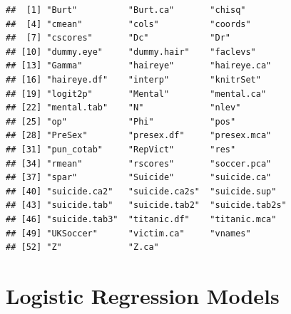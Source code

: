 \documentclass[11pt]{book}
\renewenvironment{knitrout}{\small\renewcommand{\baselinestretch}{.85}}{} %
\begin{document}
\begin{knitrout}\footnotesize
{}\color{fgcolor}\begin{kframe}
\begin{alltt}
\hlopt{$} \hlkwb{<-} \hlstd{(}
\hlopt{$}
\end{alltt}
\begin{verbatim}
##  [1] "Burt"          "Burt.ca"       "chisq"        
##  [4] "cmean"         "cols"          "coords"       
##  [7] "cscores"       "Dc"            "Dr"           
## [10] "dummy.eye"     "dummy.hair"    "faclevs"      
## [13] "Gamma"         "haireye"       "haireye.ca"   
## [16] "haireye.df"    "interp"        "knitrSet"     
## [19] "logit2p"       "Mental"        "mental.ca"    
## [22] "mental.tab"    "N"             "nlev"         
## [25] "op"            "Phi"           "pos"          
## [28] "PreSex"        "presex.df"     "presex.mca"   
## [31] "pun_cotab"     "RepVict"       "res"          
## [34] "rmean"         "rscores"       "soccer.pca"   
## [37] "spar"          "Suicide"       "suicide.ca"   
## [40] "suicide.ca2"   "suicide.ca2s"  "suicide.sup"  
## [43] "suicide.tab"   "suicide.tab2"  "suicide.tab2s"
## [46] "suicide.tab3"  "titanic.df"    "titanic.mca"  
## [49] "UKSoccer"      "victim.ca"     "vnames"       
## [52] "Z"             "Z.ca"
\end{verbatim}
\begin{alltt}
\hlstd{(}\hlopt{$}\hlstd{ch06[}\hlopt{$}\hlstd{(}\hlstd{)\{}\hlopt{!}\hlstd{(}\hlstd{(n))\})])}
\end{alltt}
\end{kframe}
\end{knitrout}





\chapter{Logistic Regression Models}\label{ch:logistic}
\end{document}
